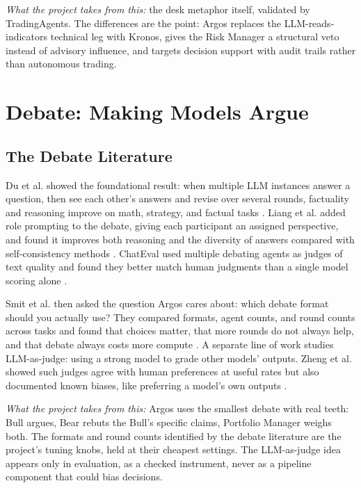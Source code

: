 \documentclass[conference]{IEEEtran}
\newcommand{\sys}{Argos}
\begin{document}
\emph{What the project takes from this:} the desk metaphor itself, validated by TradingAgents. The differences are the point: \sys{} replaces the LLM-reads-indicators technical leg with Kronos, gives the Risk Manager a structural veto instead of advisory influence, and targets decision support with audit trails rather than autonomous trading.

\section{Debate: Making Models Argue}
\label{sec:debate}

\subsection{The Debate Literature}

Du et al. showed the foundational result: when multiple LLM instances answer a question, then see each other's answers and revise over several rounds, factuality and reasoning improve on math, strategy, and factual tasks \cite{du2023debate}. Liang et al. added role prompting to the debate, giving each participant an assigned perspective, and found it improves both reasoning and the diversity of answers compared with self-consistency methods \cite{liang2023divergent}. ChatEval used multiple debating agents as judges of text quality and found they better match human judgments than a single model scoring alone \cite{chan2023chateval}.

Smit et al. then asked the question \sys{} cares about: which debate format should you actually use? They compared formats, agent counts, and round counts across tasks and found that choices matter, that more rounds do not always help, and that debate always costs more compute \cite{smit2024mad}. A separate line of work studies LLM-as-judge: using a strong model to grade other models' outputs. Zheng et al. showed such judges agree with human preferences at useful rates but also documented known biases, like preferring a model's own outputs \cite{zheng2023judging}.

\emph{What the project takes from this:} \sys{} uses the smallest debate with real teeth: Bull argues, Bear rebuts the Bull's specific claims, Portfolio Manager weighs both. The formats and round counts identified by the debate literature are the project's tuning knobs, held at their cheapest settings. The LLM-as-judge idea appears only in evaluation, as a checked instrument, never as a pipeline component that could bias decisions.
\end{document}
